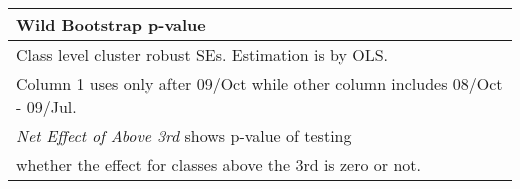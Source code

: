{\begin{tabular}{l*{5}{c}}
Wild Bootstrap p-value &                     &                     &                     &                     &                     \\
\hline\hline
\multicolumn{6}{l}{\footnotesize Class level cluster robust SEs. Estimation is by OLS.}\\
\multicolumn{6}{l}{\footnotesize Column 1 uses only after 09/Oct while other column includes 08/Oct - 09/Jul.}\\
\multicolumn{6}{l}{\footnotesize {\it Net Effect of Above 3rd} shows p-value of testing}\\
\multicolumn{6}{l}{\footnotesize whether the effect for classes above the 3rd is zero or not.}\\
\end{tabular}
}
